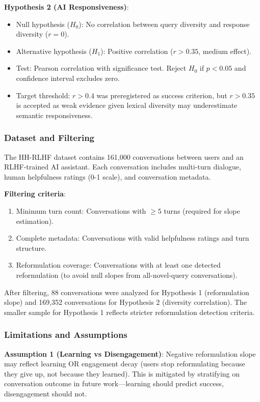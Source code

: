 \textbf{Hypothesis 2 (AI Responsiveness)}:
\begin{itemize}
\item Null hypothesis ($H_0$): No correlation between query diversity and response diversity ($r = 0$).
\item Alternative hypothesis ($H_1$): Positive correlation ($r > 0.35$, medium effect).
\item Test: Pearson correlation with significance test. Reject $H_0$ if $p < 0.05$ and confidence interval excludes zero.
\item Target threshold: $r > 0.4$ was preregistered as success criterion, but $r > 0.35$ is accepted as weak evidence given lexical diversity may underestimate semantic responsiveness.
\end{itemize}

\subsubsection{Dataset and Filtering}

The HH-RLHF dataset \citep{bai2022constitutional} contains 161,000 conversations between users and an RLHF-trained AI assistant. Each conversation includes multi-turn dialogue, human helpfulness ratings (0-1 scale), and conversation metadata.

\textbf{Filtering criteria}:
\begin{enumerate}
\item Minimum turn count: Conversations with $\geq 5$ turns (required for slope estimation).
\item Complete metadata: Conversations with valid helpfulness ratings and turn structure.
\item Reformulation coverage: Conversations with at least one detected reformulation (to avoid null slopes from all-novel-query conversations).
\end{enumerate}

After filtering, 88 conversations were analyzed for Hypothesis 1 (reformulation slope) and 169,352 conversations for Hypothesis 2 (diversity correlation). The smaller sample for Hypothesis 1 reflects stricter reformulation detection criteria.

\subsubsection{Limitations and Assumptions}

\textbf{Assumption 1 (Learning vs Disengagement)}: Negative reformulation slope may reflect learning OR engagement decay (users stop reformulating because they give up, not because they learned). This is mitigated by stratifying on conversation outcome in future work---learning should predict success, disengagement should not.

